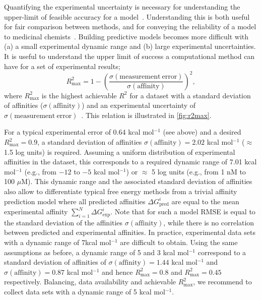 \documentclass[9pt,bestpractices]{livecoms}
\begin{document}
Quantifying the experimental uncertainty is necessary for understanding the upper-limit of feasible accuracy for a model~\cite{brown2009healthy}. Understanding this is both useful for fair comparison between methods, and for conveying the reliability of a model to medicinal chemists~\cite{griffen2020chemists}. Building predictive models becomes more difficult with (a) a small experimental dynamic range and (b) large experimental uncertainties. It is useful to understand the upper limit of success a computational method can have for a set of experimental results;
%
\begin{equation}\label{eqn:r2max}
    R^2_{\mathrm{max}} = 1 - \left(\frac{\sigma(\mathrm{measurement\   error})}{\sigma({\mathrm{affinity}})}\right) ^2,
\end{equation}
%
where $R^2_{\mathrm{max}}$ is the highest achievable $R^2$ for a dataset with a standard deviation of affinities ($\sigma(\mathrm{affinity})$) and an experimental uncertainty of  $\sigma\mathrm{(measurement\ error)}$~\cite{sheridan2020experimental}. This relation is illustrated in \ref{fig:r2max}.

For a typical experimental error of 0.64 kcal mol$^{-1}$ (see above) and a desired $R^2_{\mathrm{max}} = 0.9$, a standard deviation of affinities $\sigma(\mathrm{affinity}) = 2.02 $ kcal mol$^{-1}$ ($\approx$1.5 log units) is required. Assuming a uniform distribution of experimental affinities in the dataset, this corresponds to a required dynamic range of 7.01 kcal mol$^{-1}$ (e.g., from $-12$ to $-5$ kcal mol$^{-1}$) or $\approx$ 5 log units (e.g., from 1 nM to 100 $\mu$M). This dynamic range and the associated standard deviation of affinities also allow to differentiate typical free energy methods from a trivial affinity prediction model where all predicted affinities $\Delta G_{\text{pred}}^i$ are equal to the mean experimental affinity $\sum_{i=1}^{N} \Delta G_{\text{exp}}^i$. Note that for such a model RMSE is equal to the standard deviation of the affinities $\sigma({\mathrm{affinity}})$, while there is no correlation between predicted and experimental affinities. In practice, experimental data sets with a dynamic range of 7kcal mol$^{-1}$ are difficult to obtain. Using the same assumptions as before, a dynamic range of 5 and 3 kcal mol$^{-1}$ correspond to a standard deviation of affinities of $\sigma(\mathrm{affinity}) = 1.44 $ kcal mol$^{-1}$ and $\sigma(\mathrm{affinity}) = 0.87 $ kcal mol$^{-1}$ and hence $R^2_{\mathrm{max}} = 0.8$ and $R^2_{\mathrm{max}} = 0.45$ respectively. Balancing, data availability and achievable $R^2_{\mathrm{max}}$, we recommend to collect data sets with a dynamic range of 5 kcal mol$^{-1}$.
\end{document}
